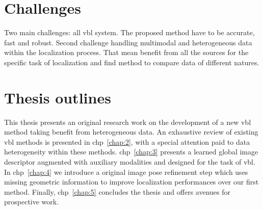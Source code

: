 \section{Challenges}
Two main challenges: all \ac{vbl} system. The proposed method have to be accurate, fast and robust. 
Second challenge handling multimodal and heterogeneous data within the localization process. That mean benefit from all the sources for the specific task of localization and find method to compare data of different natures.

\section{Thesis outlines}
This thesis presents an original research work on the development of a new \ac{vbl} method taking benefit from heterogeneous data. An exhaustive review of existing \ac{vbl} methods is presented in \acl{chp}~\ref{chap:2}, with a special attention paid to data heterogeneity within these methods. \Ac{chp}~\ref{chap:3} presents a learned global image descriptor augmented with auxiliary modalities and designed for the task of \ac{vbl}. In \ac{chp}~\ref{chap:4} we introduce a original image pose refinement step which uses missing geometric information to improve localization performances over our first method. Finally, \ac{chp}~\ref{chap:5} concludes the thesis and offers avenues for prospective work.